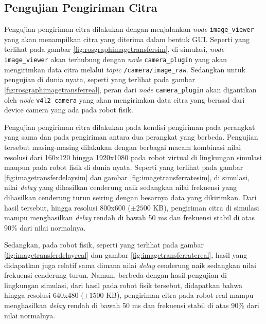 \subsection{Pengujian Pengiriman Citra}
\label{subsec:imagetransfertesting}




Pengujian pengiriman citra dilakukan dengan menjalankan \emph{node} \lstinline{image_viewer} yang akan menampilkan citra yang diterima dalam bentuk GUI.
Seperti yang terlihat pada gambar \ref{fig:rosgraphimagetransfersim},
  di simulasi,
  \emph{node} \lstinline{image_viewer} akan terhubung dengan \emph{node} \lstinline{camera_plugin} yang akan mengirimkan data citra melalui \emph{topic} \lstinline{/camera/image_raw}.
Sedangkan untuk pengujian di dunia nyata,
  seperti yang terlihat pada gambar \ref{fig:rosgraphimagetransferreal},
  peran dari \emph{node} \lstinline{camera_plugin} akan digantikan oleh \emph{node} \lstinline{v4l2_camera} yang akan mengirimkan data citra yang berasal dari device camera yang ada pada robot fisik.




Pengujian pengiriman citra dilakukan pada kondisi pengiriman pada perangkat yang sama dan pada pengiriman antara dua perangkat yang berbeda.
Pengujian tersebut masing-masing dilakukan dengan berbagai macam kombinasi nilai resolusi dari 160x120 hingga 1920x1080 pada robot virtual di lingkungan simulasi maupun pada robot fisik di dunia nyata.
Seperti yang terlihat pada gambar \ref{fig:imagetransferdelaysim} dan gambar \ref{fig:imagetransferratesim},
  di simulasi,
  nilai \emph{delay} yang dihasilkan cenderung naik sedangkan nilai frekuensi yang dihasilkan cenderung turun seiring dengan besarnya data yang dikirimkan.
Dari hasil tersebut,
  hingga resolusi 800x600 ($\pm2500$ KB),
  pengiriman citra di simulasi mampu menghasilkan \emph{delay} rendah di bawah 50 ms dan frekuensi stabil di atas 90\% dari nilai normalnya.




Sedangkan,
  pada robot fisik,
  seperti yang terlihat pada gambar \ref{fig:imagetransferdelayreal} dan gambar \ref{fig:imagetransferratereal},
  hasil yang didapatkan juga relatif sama dimana nilai \emph{delay} cenderung naik sedangkan nilai frekuensi cenderung turun.
Namun,
  berbeda dengan hasil pengujian di lingkungan simulasi,
  dari hasil pada robot fisik tersebut,
  didapatkan bahwa hingga resolusi 640x480 ($\pm1500$ KB),
  pengiriman citra pada robot real mampu menghasilkan \emph{delay} rendah di bawah 50 ms dan frekuensi stabil di atas 90\% dari nilai normalnya.
